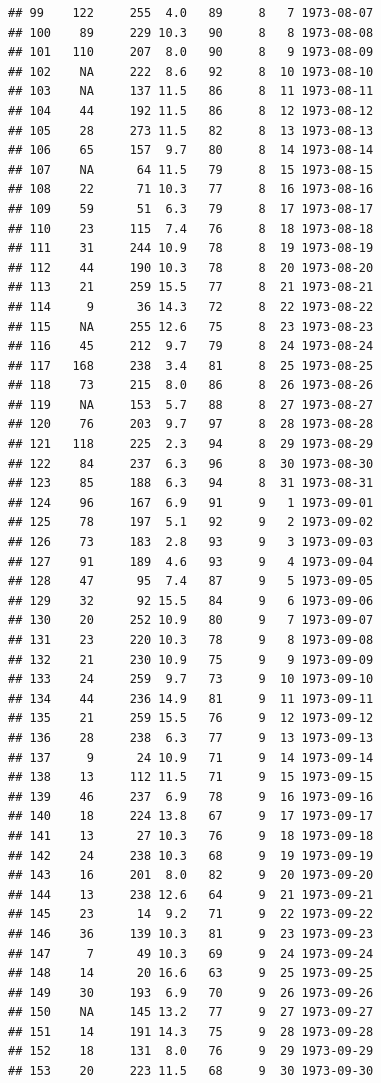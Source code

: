 \documentclass[11pt,]{book}
\begin{document}
\begin{verbatim}
## 99    122     255  4.0   89     8   7 1973-08-07
## 100    89     229 10.3   90     8   8 1973-08-08
## 101   110     207  8.0   90     8   9 1973-08-09
## 102    NA     222  8.6   92     8  10 1973-08-10
## 103    NA     137 11.5   86     8  11 1973-08-11
## 104    44     192 11.5   86     8  12 1973-08-12
## 105    28     273 11.5   82     8  13 1973-08-13
## 106    65     157  9.7   80     8  14 1973-08-14
## 107    NA      64 11.5   79     8  15 1973-08-15
## 108    22      71 10.3   77     8  16 1973-08-16
## 109    59      51  6.3   79     8  17 1973-08-17
## 110    23     115  7.4   76     8  18 1973-08-18
## 111    31     244 10.9   78     8  19 1973-08-19
## 112    44     190 10.3   78     8  20 1973-08-20
## 113    21     259 15.5   77     8  21 1973-08-21
## 114     9      36 14.3   72     8  22 1973-08-22
## 115    NA     255 12.6   75     8  23 1973-08-23
## 116    45     212  9.7   79     8  24 1973-08-24
## 117   168     238  3.4   81     8  25 1973-08-25
## 118    73     215  8.0   86     8  26 1973-08-26
## 119    NA     153  5.7   88     8  27 1973-08-27
## 120    76     203  9.7   97     8  28 1973-08-28
## 121   118     225  2.3   94     8  29 1973-08-29
## 122    84     237  6.3   96     8  30 1973-08-30
## 123    85     188  6.3   94     8  31 1973-08-31
## 124    96     167  6.9   91     9   1 1973-09-01
## 125    78     197  5.1   92     9   2 1973-09-02
## 126    73     183  2.8   93     9   3 1973-09-03
## 127    91     189  4.6   93     9   4 1973-09-04
## 128    47      95  7.4   87     9   5 1973-09-05
## 129    32      92 15.5   84     9   6 1973-09-06
## 130    20     252 10.9   80     9   7 1973-09-07
## 131    23     220 10.3   78     9   8 1973-09-08
## 132    21     230 10.9   75     9   9 1973-09-09
## 133    24     259  9.7   73     9  10 1973-09-10
## 134    44     236 14.9   81     9  11 1973-09-11
## 135    21     259 15.5   76     9  12 1973-09-12
## 136    28     238  6.3   77     9  13 1973-09-13
## 137     9      24 10.9   71     9  14 1973-09-14
## 138    13     112 11.5   71     9  15 1973-09-15
## 139    46     237  6.9   78     9  16 1973-09-16
## 140    18     224 13.8   67     9  17 1973-09-17
## 141    13      27 10.3   76     9  18 1973-09-18
## 142    24     238 10.3   68     9  19 1973-09-19
## 143    16     201  8.0   82     9  20 1973-09-20
## 144    13     238 12.6   64     9  21 1973-09-21
## 145    23      14  9.2   71     9  22 1973-09-22
## 146    36     139 10.3   81     9  23 1973-09-23
## 147     7      49 10.3   69     9  24 1973-09-24
## 148    14      20 16.6   63     9  25 1973-09-25
## 149    30     193  6.9   70     9  26 1973-09-26
## 150    NA     145 13.2   77     9  27 1973-09-27
## 151    14     191 14.3   75     9  28 1973-09-28
## 152    18     131  8.0   76     9  29 1973-09-29
## 153    20     223 11.5   68     9  30 1973-09-30
\end{verbatim}
\end{document}
